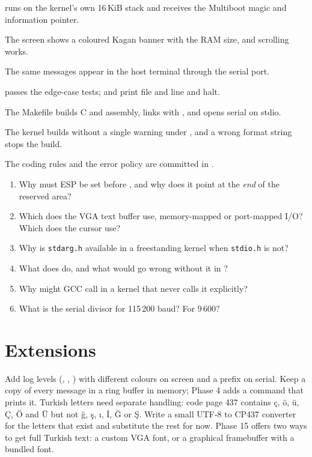 \documentclass[11pt,a4paper]{article}
\begin{document}
\begin{milestonebox}
\begin{checklist}
  \item {} runs on the kernel's own 16\,KiB stack and receives the Multiboot magic and information pointer.
  \item The screen shows a coloured Kagan banner with the RAM size, and scrolling works.
  \item The same messages appear in the host terminal through the serial port.
  \item {} passes the edge-case tests;  and  print file and line and halt.
  \item The Makefile builds C and assembly, links with , and  opens serial on stdio.
  \item The kernel builds without a single warning under , and a wrong format string stops the build.
  \item The coding rules and the error policy are committed in .
\end{checklist}
\end{milestonebox}

\begin{questionbox}
\begin{enumerate}
  \item Why must ESP be set before , and why does it point at the \emph{end} of the reserved area?
  \item Which does the VGA text buffer use, memory-mapped or port-mapped I/O? Which does the cursor use?
  \item Why is \texttt{stdarg.h} available in a freestanding kernel when \texttt{stdio.h} is not?
  \item What does  do, and what would go wrong without it in ?
  \item Why might GCC call  in a kernel that never calls it explicitly?
  \item What is the serial divisor for 115\,200 baud? For 9\,600?
\end{enumerate}
\end{questionbox}

\section{Extensions}

Add log levels (, , ) with different colours on screen and a prefix on serial. Keep
a copy of every message in a ring buffer in memory; Phase 4 adds a  command that prints it.
Turkish letters need separate handling: code page 437 contains ç, ö, ü, Ç, Ö and Ü but not ğ, ş, ı, İ, Ğ or Ş.
Write a small UTF-8 to CP437 converter for the letters that exist and substitute the rest for now. Phase 15
offers two ways to get full Turkish text: a custom VGA font, or a graphical framebuffer with a bundled font.

\booklegend
\end{document}
